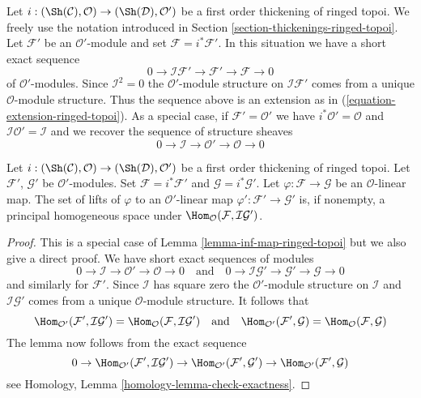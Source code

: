 \noindent
Let $i : (\Sh(\mathcal{C}), \mathcal{O}) \to (\Sh(\mathcal{D}), \mathcal{O}')$
be a first order thickening of ringed topoi. We freely use the notation
introduced in Section \ref{section-thickenings-ringed-topoi}.
Let $\mathcal{F}'$ be an $\mathcal{O}'$-module
and set $\mathcal{F} = i^*\mathcal{F}'$.
In this situation we have a short exact sequence
$$
0 \to \mathcal{I}\mathcal{F}' \to \mathcal{F}' \to \mathcal{F} \to 0
$$
of $\mathcal{O}'$-modules. Since $\mathcal{I}^2 = 0$ the
$\mathcal{O}'$-module structure on $\mathcal{I}\mathcal{F}'$
comes from a unique $\mathcal{O}$-module structure.
Thus the sequence above is an extension as in
(\ref{equation-extension-ringed-topoi}).
As a special case, if $\mathcal{F}' = \mathcal{O}'$ we have
$i^*\mathcal{O}' = \mathcal{O}$ and
$\mathcal{I}\mathcal{O}' = \mathcal{I}$ and we recover the
sequence of structure sheaves
$$
0 \to \mathcal{I} \to \mathcal{O}' \to \mathcal{O} \to 0
$$

\begin{lemma}
\label{lemma-inf-map-special-ringed-topoi}
Let $i : (\Sh(\mathcal{C}), \mathcal{O}) \to (\Sh(\mathcal{D}), \mathcal{O}')$
be a first order thickening of ringed topoi.
Let $\mathcal{F}'$, $\mathcal{G}'$ be $\mathcal{O}'$-modules.
Set $\mathcal{F} = i^*\mathcal{F}'$ and $\mathcal{G} = i^*\mathcal{G}'$.
Let $\varphi : \mathcal{F} \to \mathcal{G}$ be an $\mathcal{O}$-linear map.
The set of lifts of $\varphi$ to an $\mathcal{O}'$-linear map
$\varphi' : \mathcal{F}' \to \mathcal{G}'$ is, if nonempty, a principal
homogeneous space under
$\Hom_\mathcal{O}(\mathcal{F}, \mathcal{I}\mathcal{G}')$.
\end{lemma}

\begin{proof}
This is a special case of Lemma \ref{lemma-inf-map-ringed-topoi} but we also
give a direct proof. We have short exact sequences of modules
$$
0 \to \mathcal{I} \to \mathcal{O}' \to \mathcal{O} \to 0
\quad\text{and}\quad
0 \to \mathcal{I}\mathcal{G}' \to \mathcal{G}' \to \mathcal{G} \to 0
$$
and similarly for $\mathcal{F}'$.
Since $\mathcal{I}$ has square zero the $\mathcal{O}'$-module
structure on $\mathcal{I}$ and $\mathcal{I}\mathcal{G}'$ comes from
a unique $\mathcal{O}$-module structure. It follows that
$$
\Hom_{\mathcal{O}'}(\mathcal{F}', \mathcal{I}\mathcal{G}') =
\Hom_\mathcal{O}(\mathcal{F}, \mathcal{I}\mathcal{G}')
\quad\text{and}\quad
\Hom_{\mathcal{O}'}(\mathcal{F}', \mathcal{G}) =
\Hom_\mathcal{O}(\mathcal{F}, \mathcal{G})
$$
The lemma now follows from the exact sequence
$$
0 \to \Hom_{\mathcal{O}'}(\mathcal{F}', \mathcal{I}\mathcal{G}') \to
\Hom_{\mathcal{O}'}(\mathcal{F}', \mathcal{G}') \to
\Hom_{\mathcal{O}'}(\mathcal{F}', \mathcal{G})
$$
see Homology, Lemma \ref{homology-lemma-check-exactness}.
\end{proof}

